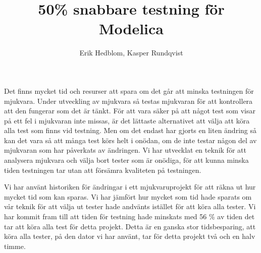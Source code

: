 \documentclass{popsci}
\author{Erik Hedblom, Kasper Rundqvist}
\title{50\% snabbare testning för Modelica}
\begin{document}


{\noindent Det finns mycket tid och resurser att spara om det går att minska testningen för mjukvara. Under utveckling av mjukvara så testas mjukvaran för att kontrollera att den fungerar som det är tänkt. För att vara säker på att något test som visar på ett fel i mjukvaran inte missas, är det lättaste alternativet att välja att köra alla test som finns vid testning. Men om det endast har gjorts en liten ändring så kan det vara så att många test körs helt i onödan, om de inte testar någon del av mjukvaran som har påverkats av ändringen. Vi har utvecklat en teknik för att analysera mjukvara och välja bort tester som är onödiga, för att kunna minska tiden testningen tar utan att försämra kvaliteten på testningen.

Vi har använt historiken för ändringar i ett mjukvaruprojekt för att räkna ut hur mycket tid som kan sparas. Vi har jämfört hur mycket som tid hade sparats om vår teknik för att välja ut tester hade andvänts istället för att köra alla tester. Vi har kommit fram till att tiden för testning hade minskats med 56 \% av tiden det tar att köra alla test för detta projekt. Detta är en ganska stor tidsbesparing, att köra alla tester, på den dator vi har använt, tar för detta projekt två och en halv timme.
}
\end{document}
